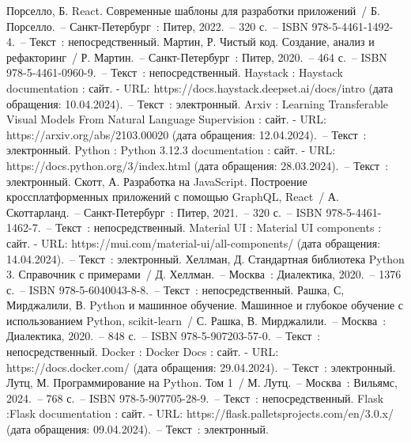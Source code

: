 \newsection
{}

\begin{thebibliography}{9}
     Порселло, Б. React. Современные шаблоны для разработки приложений~/ Б. Порселло.~– Санкт-Петербург~: Питер, 2022.~– 320 с.~– ISBN 978-5-4461-1492-4.~– Текст~: непосредственный.
    	Мартин, Р. Чистый код. Создание, анализ и рефакторинг~/ Р. Мартин.~– Санкт-Петербург~: Питер, 2020.~– 464 с.~– ISBN 978-5-4461-0960-9.~– Текст~: непосредственный.
     Haystack : Haystack documentation : сайт. - URL: https://docs.haystack.deepset.ai/docs/intro (дата обращения: 10.04.2024).~– Текст~: электронный.
	 Arxiv : Learning Transferable Visual Models From Natural Language Supervision : сайт. - URL: https://arxiv.org/abs/2103.00020 (дата обращения: 12.04.2024).~– Текст~: электронный.
     Python : Python 3.12.3 documentation : сайт. - URL: https://docs.python.org/3/index.html (дата обращения: 28.03.2024).~– Текст~: электронный.
     Скотт, А. Разработка на JavaScript. Построение кроссплатформенных приложений с помощью GraphQL, React~/ А. Скоттарланд.~– Санкт-Петербург~: Питер, 2021.~– 320 с.~– ISBN 978-5-4461-1462-7.~– Текст~: непосредственный.
     Material UI : Material UI components : сайт. - URL: https://mui.com/material-ui/all-components/ (дата обращения: 14.04.2024).~– Текст~: электронный.
     Хеллман, Д. Стандартная библиотека Python 3. Справочник с примерами~/ Д. Хеллман.~– Москва~: Диалектика, 2020.~– 1376 с.~– ISBN 978-5-6040043-8-8.~– Текст~: непосредственный.
     Рашка, С, Мирджалили, В. Python и машинное обучение. Машинное и глубокое обучение с использованием Python, scikit-learn~/ С. Рашка, В. Мирджалили.~– Москва~: Диалектика, 2020.~– 848 с.~– ISBN 978-5-907203-57-0.~– Текст~: непосредственный.
     Docker : Docker  Docs : сайт. - URL: https://docs.docker.com/ (дата обращения: 29.04.2024).~– Текст~: электронный.
     Лутц, М. Программирование на Python. Том 1~/ М. Лутц.~– Москва~: Вильямс, 2024.~– 768 с.~– ISBN 978-5-907705-28-9.~– Текст~: непосредственный.
     Flask :Flask documentation : сайт. - URL: https://flask.palletsprojects.com/en/3.0.x/ (дата обращения: 09.04.2024).~– Текст~: электронный.
\end{thebibliography}
